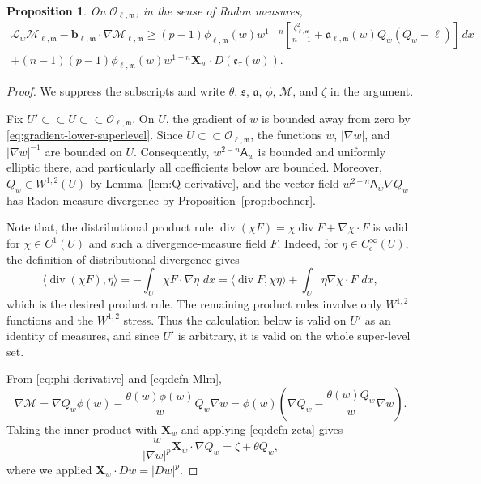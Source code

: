 \documentclass[reqno,12pt]{amsart}
\numberwithin{equation}{section}
\newtheorem{prop}[thm]{Proposition}
\theoremstyle{remark}
\newcommand{\dd}{\,d}
\newcommand{\Xbf}{\mathbf X}
\newcommand{\Lscr}{\mathscr L}
\newcommand{\Mscr}{\mathscr M}
\begin{document}
\begin{prop}\label{prop:bochner-lower}
On $\mathcal O_{\ell,\mathfrak m}$, in the sense of Radon measures,
\begin{multline}
\label{eq:completed-square}
\Lscr_w\Mscr_{\ell,\mathfrak m}
 -\mathbf b_{\ell,\mathfrak m}\cdot
  \nabla\Mscr_{\ell,\mathfrak m}  
\ge (p-1)\phi_{\ell,\mathfrak m}(w)w^{1-n}
 \left[  \frac{\zeta_{\ell,\mathfrak m}^2}{n-1} +\mathfrak a_{\ell,\mathfrak m}(w) Q_w(Q_w-\ell) \right]\dd x\\
 +(n-1)(p-1)\phi_{\ell,\mathfrak m}(w)w^{1-n}
 \Xbf_w\cdot D(\mathfrak e_\tau(w)).
\end{multline}
\end{prop}

\begin{proof}
We suppress the subscripts and write $\theta$, $\mathfrak s$, $\mathfrak a$, $\phi$, $\Mscr$, and $\zeta$ in the argument.   

Fix $U'\subset\subset U\subset\subset\mathcal O_{\ell,\mathfrak m}$.  On $U$, the gradient of $w$ is bounded away from zero by
\eqref{eq:gradient-lower-superlevel}.  Since $U\subset\subset
\mathcal O_{\ell,\mathfrak m}$, the functions $w$,
$|\nabla w|$, and $|\nabla w|^{-1}$ are bounded on $U$.
Consequently, $w^{2-n}\mathsf A_w$ is bounded and uniformly
elliptic there, and particularly all coefficients below are bounded. Moreover,  $Q_w\in W^{1,2}(U)$ by Lemma~\ref{lem:Q-derivative}, and the vector field
$w^{2-n}\mathsf A_w\nabla Q_w$ has Radon-measure divergence by
Proposition~\ref{prop:bochner}.  


Note that, the distributional product rule
$\operatorname{div}(\chi F) =\chi\operatorname{div}F+\nabla\chi\cdot F$
is valid for $\chi\in C^1(U)$ and such a divergence-measure field $F$.  Indeed, for $\eta\in C_c^\infty(U)$, the definition of distributional divergence gives
\begin{equation}\label{eq:measure-product}
\langle\operatorname{div}(\chi F),\eta\rangle
 =-\int_U\chi F\cdot\nabla\eta\,\dd x  =\langle\operatorname{div}F,\chi\eta\rangle    +\int_U\eta\nabla\chi\cdot F\,\dd x,
\end{equation}
which is the desired product rule. 
The remaining product rules involve only $W^{1,2}$ functions and the
$W^{1,2}$ stress.  Thus the calculation below is valid on $U'$ as an identity of measures, and since $U'$ is arbitrary, it is valid on the whole super-level set.

From \eqref{eq:phi-derivative} and \eqref{eq:defn-Mlm},
\begin{equation}\label{eq:nablaM}
\nabla\Mscr =\nabla Q_w \phi(w)-\frac{\theta(w) \phi(w)}{w}  Q_w \nabla w 
=\phi(w)\left(\nabla Q_w-\frac{\theta(w)Q_w}{w}\nabla w \right).
\end{equation}
Taking the inner product with $\Xbf_w$ and applying \eqref{eq:defn-zeta}  gives
\begin{equation}\label{eq:zeta-relation}
\frac{w}{|\nabla w|^p}\Xbf_w\cdot\nabla Q_w =\zeta+\theta Q_w,
\end{equation}
where we applied $\Xbf_w\cdot Dw=|Dw|^p$.



\end{proof}
\end{document}
